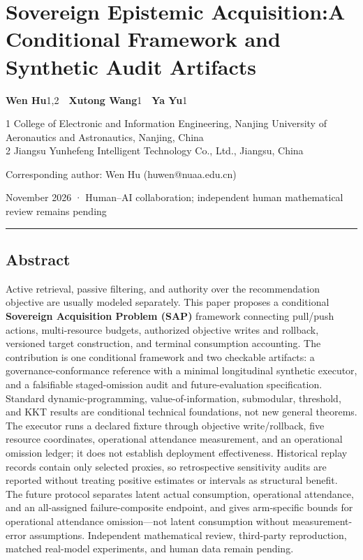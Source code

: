 \documentclass[
  11pt]{article}
\author{}
\date{21 November 2026}
\begin{document}
\section{\texorpdfstring{Sovereign Epistemic Acquisition:\newline A
Conditional Framework and Synthetic Audit
Artifacts}{Sovereign Epistemic Acquisition:A Conditional Framework and Synthetic Audit Artifacts}}\label{sovereign-epistemic-acquisitiona-conditional-framework-and-synthetic-audit-artifacts}

\textbf{Wen Hu}1,2~~\textbf{Xutong Wang}1~~\textbf{Ya Yu}1

1 College of Electronic and Information Engineering, Nanjing University
of Aeronautics and Astronautics, Nanjing, China\\
2 Jiangsu Yunhefeng Intelligent Technology Co., Ltd., Jiangsu, China

Corresponding author: Wen Hu (huwen@nuaa.edu.cn)

November 2026 · Human--AI collaboration; independent human mathematical
review remains pending

\begin{center}\rule{0.5\linewidth}{0.5pt}\end{center}

\subsection{Abstract}\label{abstract}

Active retrieval, passive filtering, and authority over the
recommendation objective are usually modeled separately. This paper
proposes a conditional \textbf{Sovereign Acquisition Problem (SAP)}
framework connecting pull/push actions, multi-resource budgets,
authorized objective writes and rollback, versioned target construction,
and terminal consumption accounting. The contribution is one conditional
framework and two checkable artifacts: a governance-conformance
reference with a minimal longitudinal synthetic executor, and a
falsifiable staged-omission audit and future-evaluation specification.
Standard dynamic-programming, value-of-information, submodular,
threshold, and KKT results are conditional technical foundations, not
new general theorems. The executor runs a declared fixture through
objective write/rollback, five resource coordinates, operational
attendance measurement, and an operational omission ledger; it does not
establish deployment effectiveness. Historical replay records contain
only selected proxies, so retrospective sensitivity audits are reported
without treating positive estimates or intervals as structural benefit.
The future protocol separates latent actual consumption, operational
attendance, and an all-assigned failure-composite endpoint, and gives
arm-specific bounds for operational attendance omission---not latent
consumption without measurement-error assumptions. Independent
mathematical review, third-party reproduction, matched real-model
experiments, and human data remain pending.
\end{document}
